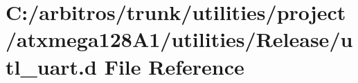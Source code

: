 \hypertarget{utilities_2project_2atxmega128_a1_2utilities_2_release_2utl__uart_8d}{\section{C\-:/arbitros/trunk/utilities/project/atxmega128\-A1/utilities/\-Release/utl\-\_\-uart.d File Reference}
\label{utilities_2project_2atxmega128_a1_2utilities_2_release_2utl__uart_8d}
}
